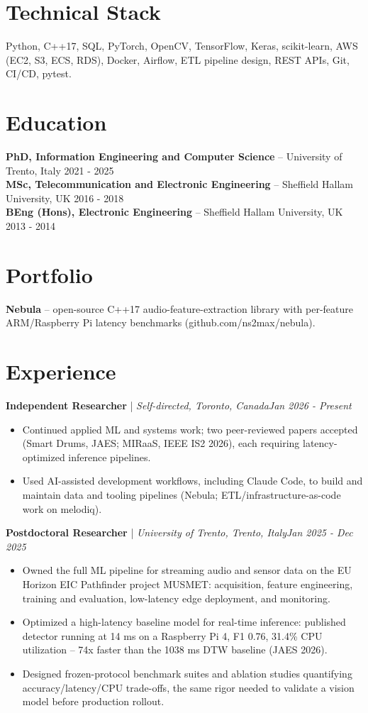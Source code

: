 \documentclass[11pt]{article}
\newenvironment{cvrole}[5]{%
  \par\noindent\textbf{\large #1} | \textit{\small #2, #3}\hfill \textit{\small #4 - #5}\par
  \begin{itemize}[leftmargin=2em, itemsep=-0.3em, topsep=-0.5em]%
}{%
  \end{itemize}\par\noindent\mbox{}\par\vspace{0.1em}%
}
\begin{document}
\section*{Technical Stack}
Python, C++17, SQL, PyTorch, OpenCV, TensorFlow, Keras, scikit-learn, AWS (EC2, S3, ECS, RDS), Docker, Airflow, ETL pipeline design, REST APIs, Git, CI/CD, pytest.

\section*{Education}
\textbf{PhD, Information Engineering and Computer Science} -- University of Trento, Italy \hfill 2021 - 2025 \\
\textbf{MSc, Telecommunication and Electronic Engineering} -- Sheffield Hallam University, UK \hfill 2016 - 2018 \\
\textbf{BEng (Hons), Electronic Engineering} -- Sheffield Hallam University, UK \hfill 2013 - 2014

\section*{Portfolio}
\textbf{Nebula} -- open-source C++17 audio-feature-extraction library with per-feature ARM/Raspberry Pi latency benchmarks (github.com/ns2max/nebula).

\section*{Experience}

\begin{cvrole}{Independent Researcher}{Self-directed}{Toronto, Canada}{Jan 2026}{Present}
\item Continued applied ML and systems work; two peer-reviewed papers accepted (Smart Drums, JAES; MIRaaS, IEEE IS2 2026), each requiring latency-optimized inference pipelines.
\item Used AI-assisted development workflows, including Claude Code, to build and maintain data and tooling pipelines (Nebula; ETL/infrastructure-as-code work on melodiq).
\end{cvrole}

\begin{cvrole}{Postdoctoral Researcher}{University of Trento}{Trento, Italy}{Jan 2025}{Dec 2025}
\item Owned the full ML pipeline for streaming audio and sensor data on the EU Horizon EIC Pathfinder project MUSMET: acquisition, feature engineering, training and evaluation, low-latency edge deployment, and monitoring.
\item Optimized a high-latency baseline model for real-time inference: published detector running at 14 ms on a Raspberry Pi 4, F1 0.76, 31.4\% CPU utilization -- 74x faster than the 1038 ms DTW baseline (JAES 2026).
\item Designed frozen-protocol benchmark suites and ablation studies quantifying accuracy/latency/CPU trade-offs, the same rigor needed to validate a vision model before production rollout.
\end{cvrole}
\end{document}
